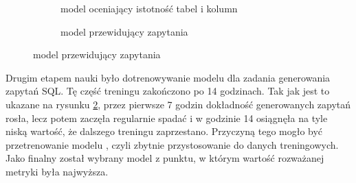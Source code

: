 \begin{figure}[ht!]
\centering
\begin{subfigure}{0.49\textwidth}
    \caption{model oceniający istotność tabel i kolumn}
    \label{plot:resdsql-classifier-accuracy}
\end{subfigure}
\hfill
\begin{subfigure}{0.49\textwidth}
    \caption{model przewidujący zapytania}
    \label{plot:resdsql-t5-accuracy}
\end{subfigure}
\label{plot:resdsql-accuracy}
\end{figure}

Drugim etapem nauki było dotrenowywanie modelu  dla zadania generowania zapytań SQL. Tę część treningu zakończono po 14 godzinach. Tak jak jest to ukazane na rysunku \ref{plot:resdsql-t5-accuracy}, przez pierwsze 7 godzin dokładność generowanych zapytań rosła, lecz potem zaczęła regularnie spadać i w godzinie 14 osiągnęła na tyle niską wartość, że dalszego treningu zaprzestano. Przyczyną tego mogło być przetrenowanie modelu , czyli zbytnie przystosowanie do danych treningowych. Jako finalny został wybrany model z punktu, w którym wartość rozważanej metryki była najwyższa.

